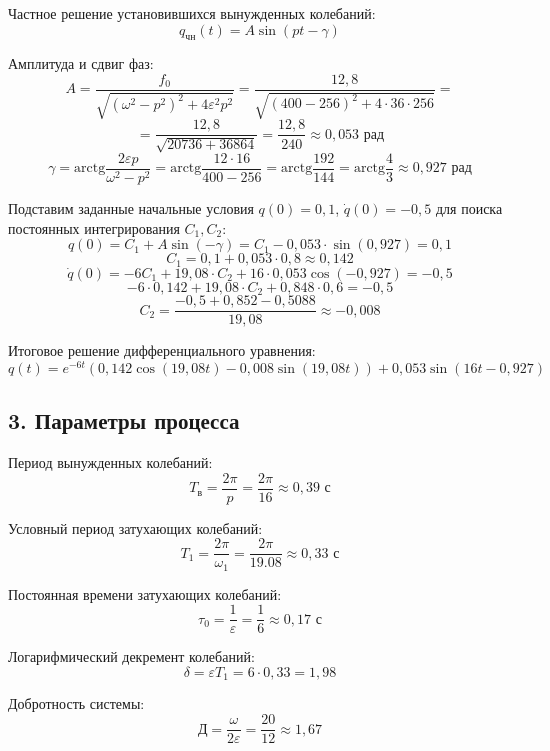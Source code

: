 \documentclass{article}
\begin{document}
Частное решение установившихся вынужденных колебаний:
$$q_{\text{чн}}(t) = A \sin(pt - \gamma)$$

Амплитуда и сдвиг фаз:
$$A = \frac{f_0}{\sqrt{(\omega^2 - p^2)^2 + 4\varepsilon^2 p^2}} = \frac{12,8}{\sqrt{(400 - 256)^2 + 4 \cdot 36 \cdot 256}} =$$
$$= \frac{12,8}{\sqrt{20736 + 36864}} = \frac{12,8}{240} \approx 0,053 \text{ рад}$$
$$\gamma = \text{arctg} \frac{2\varepsilon p}{\omega^2 - p^2} = \text{arctg} \frac{12 \cdot 16}{400 - 256} = \text{arctg} \frac{192}{144} = \text{arctg} \frac{4}{3} \approx 0,927 \text{ рад}$$

Подставим заданные начальные условия $q(0) = 0,1$, $\dot{q}(0) = -0,5$ для поиска постоянных интегрирования $C_1, C_2$:
$$q(0) = C_1 + A \sin(-\gamma) = C_1 - 0,053 \cdot \sin(0,927) = 0,1$$
$$C_1 = 0,1 + 0,053 \cdot 0,8 \approx 0,142$$
$$\dot{q}(0) = -6 C_1 + 19,08 \cdot C_2 + 16 \cdot 0,053 \cos(-0,927) = -0,5$$
$$-6 \cdot 0,142 + 19,08 \cdot C_2 + 0,848 \cdot 0,6 = -0,5$$
$$C_2 = \frac{-0,5 + 0,852 - 0,5088}{19,08} \approx -0,008$$

Итоговое решение дифференциального уравнения:
$$q(t) = e^{-6t} (0,142 \cos(19,08t) - 0,008 \sin(19,08t)) + 0,053 \sin(16t - 0,927)$$

\subsection*{3. Параметры процесса}
Период вынужденных колебаний:
$$T_{\text{в}} = \frac{2\pi}{p} = \frac{2\pi}{16} \approx 0,39 \text{ с}$$

Условный период затухающих колебаний:
$$T_1 = \frac{2\pi}{\omega_1} = \frac{2\pi}{19.08} \approx 0,33 \text{ с}$$

Постоянная времени затухающих колебаний:
$$\tau_0 = \frac{1}{\varepsilon} = \frac{1}{6} \approx 0,17 \text{ с}$$

Логарифмический декремент колебаний:
$$\delta = \varepsilon T_1 = 6 \cdot 0,33 = 1,98$$

Добротность системы:
$$\text{Д} = \frac{\omega}{2\varepsilon} = \frac{20}{12} \approx 1,67$$
\end{document}
